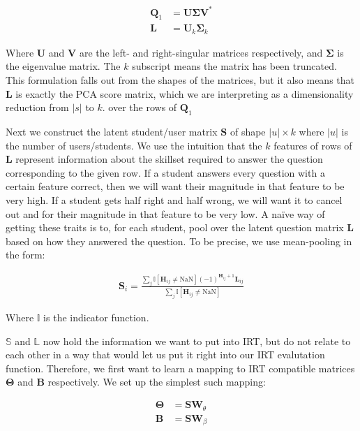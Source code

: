 \documentclass[twocolumn]{article}
\begin{document}
\begin{align}
    \mathbf{Q}_1 &= \mathbf{U}\mathbf{\Sigma}\mathbf{V}^*\\
    \mathbf{L} &= \mathbf{U}_k\mathbf{\Sigma}_k
\end{align}

Where $\mathbf{U}$ and $\mathbf{V}$ are the left- and right-singular matrices
respectively, and $\mathbf{\Sigma}$ is the eigenvalue matrix. The $k$ subscript
means the matrix has been truncated. This formulation falls out from the shapes
of the matrices, but it also means that $\mathbf{L}$ is exactly the PCA score
matrix, which we are interpreting as a dimensionality reduction from $|s|$ to
$k$. over the rows of $\mathbf{Q}_1$

Next we construct the latent student/user matrix $\mathbf{S}$ of shape $|u|
\times k$ where $|u|$ is the number of users/students. We use the intuition
that the $k$ features of rows of $\mathbf{L}$ represent information about the
skillset required to answer the question corresponding to the given row. If a
student answers every question with a certain feature correct, then we will
want their magnitude in that feature to be very high. If a student gets half
right and half wrong, we will want it to cancel out and for their magnitude in
that feature to be very low. A naïve way of getting these traits is to, for each student, pool over the latent question matrix $\mathbf{L}$ based on how they answered the question. To be precise, we use mean-pooling in the form:

\begin{align}
    \mathbf{S}_i = \frac{\sum_{j}^{} \mathbb{I}[\mathbf{H}_{ij} \ne \text{NaN}]
        (-1)^{\mathbf{H}_{ij} + 1}\mathbf{L}_{ij}}
        {\sum_{j}^{} \mathbb{I}[\mathbf{H}_{ij} \ne \text{NaN}]}
\end{align}

Where $\mathbb{I}$ is the indicator function.

$\mathbb{S}$ and $\mathbb{L}$ now hold the information we want to put into IRT,
but do not relate to each other in a way that would let us put it right into
our IRT evalutation function. Therefore, we first want to learn a mapping to
IRT compatible matrices $\mathbf{\Theta}$ and $\mathbf{B}$ respectively. We set
up the simplest such mapping:

\begin{align}
    \mathbf{\Theta} &= \mathbf{S} \mathbf{W}_\theta \\
    \mathbf{B} &= \mathbf{S} \mathbf{W}_\beta
\end{align}
\end{document}

